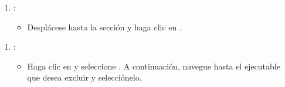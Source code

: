 \documentclass[letterpaper,10pt,spanish]{sphinxmanual}
\begin{document}
\begin{figure}[htbp]
\centering

\noindent{}
\end{figure}
\begin{enumerate}
%
\setcounter{enumi}{3}
\item {} 
\sphinxAtStartPar
{}:
\begin{itemize}
\item {} 
\sphinxAtStartPar
Desplácese hasta la sección  y haga clic en .

\end{itemize}

\end{enumerate}

\begin{figure}[htbp]
\centering

\noindent{}
\end{figure}
\begin{enumerate}
%
\setcounter{enumi}{4}
\item {} 
\sphinxAtStartPar
{}:
\begin{itemize}
\item {} 
\sphinxAtStartPar
Haga clic en  y seleccione . A continuación, navegue hasta el ejecutable que desea excluir y selecciónelo.

\end{itemize}

\end{enumerate}

\begin{figure}[htbp]
\centering

\noindent{}
\end{figure}

\begin{figure}[htbp]
\centering

\noindent{}
\end{figure}

\begin{figure}[htbp]
\centering

\noindent{}
\end{figure}
\end{document}
